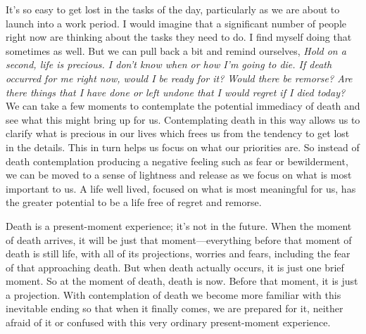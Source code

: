 It's so easy to get lost in the tasks of the day, particularly as we 
are about to launch into a work period. I would imagine that a 
significant number of people right now are thinking about the tasks 
they need to do. I find myself doing that sometimes as well. But we can 
pull back a bit and remind ourselves, \emph{Hold on a second, life is 
precious. I don't know when or how I'm going to die. If death occurred 
for me right now, would I be ready for it? Would there be remorse? Are 
there things that I have done or left undone that I would regret if I 
died today?} We can take a few moments to contemplate the potential 
immediacy of death and see what this might bring up for us. 
Contemplating death in this way allows us to clarify what is precious 
in our lives which frees us from the tendency to get lost in the 
details. This in turn helps us focus on what our priorities are. So 
instead of death contemplation producing a negative feeling such as 
fear or bewilderment, we can be moved to a sense of lightness and 
release as we focus on what is most important to us. A life well lived, 
focused on what is most meaningful for us, has the greater potential to 
be a life free of regret and remorse.

Death is a present-moment experience; it's not in the future. When the 
moment of death arrives, it will be just that moment---everything 
before that moment of death is still life, with all of its projections, 
worries and fears, including the fear of that approaching death. But 
when death actually occurs, it is just one brief moment. So at the 
moment of death, death is now. Before that moment, it is just a 
projection. With contemplation of death we become more familiar with 
this inevitable ending so that when it finally comes, we are prepared 
for it, neither afraid of it or confused with this very ordinary 
present-moment experience.

